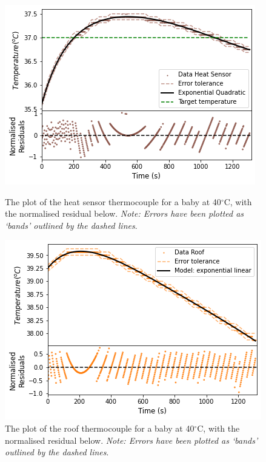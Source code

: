 \documentclass{article}
\begin{document}
\begin{figure}[H]
\centering
\begin{minipage}{.48\linewidth}
    \captionsetup{justification=centering,margin=0.3cm}
    \includegraphics[width=\linewidth]{Heat sensor 40C.png}
    \caption{The plot of the heat sensor thermocouple for a baby at 40$^{\circ}$C, with the normalised residual below. \textit{Note: Errors have been plotted as ‘bands’ outlined by the dashed lines}.}
    \label{40C HS}
\end{minipage}
\hfill
\begin{minipage}{.48\linewidth}
    \captionsetup{justification=centering,margin=0.6cm}
    \includegraphics[width=\linewidth]{Roof 40C.png}
    \caption{The plot of the roof thermocouple for a baby at 40$^{\circ}$C, with the normalised residual below. \textit{Note: Errors have been plotted as ‘bands’ outlined by the dashed lines}.}
    \label{40C roof}
    \end{minipage}
\end{figure}
\end{document}
